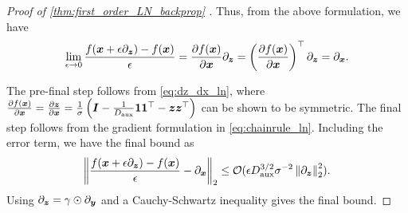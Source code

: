 \begin{proof}[ Proof of \cref{thm:first_order_LN_backprop} ]
Thus, from the above formulation, we have
\begin{align*}
    \lim_{\epsilon \to 0} \frac{ f( {\bm{x}} + \epsilon \partial_{ {\bm{z}} } ) - f({\bm{x}}) }{ \epsilon } = \frac{ \partial  f({\bm{x}}) }{ \partial {\bm{x}} }\partial_{ {\bm{z}} } = \left( \frac{ \partial  f({\bm{x}}) }{ \partial {\bm{x}} } \right)^{\top} \partial_{ {\bm{z}} } = \partial_{{\bm{x}}}.
\end{align*}

The pre-final step follows from \cref{eq:dz_dx_ln}, where $\frac{ \partial  f({\bm{x}}) }{ \partial {\bm{x}} } = \frac{\partial {\bm{z}}}{ \partial {\bm{x}}} = \frac{1}{\sigma} \left( {\bm{I}} - \frac{ 1 }{ D_{\text{aux}} } \mathbf{1} \mathbf{1}^{\top} - {\bm{z}} {\bm{z}}^{\top} \right)$ can be shown to be symmetric. The final step follows from the gradient formulation in \cref{eq:chainrule_ln}. Including the error term, we have the final bound as
\begin{align*}
    \left\| \frac{ f( {\bm{x}} + \epsilon \partial_{ {\bm{z}} } ) - f({\bm{x}}) }{ \epsilon } - \partial_{{\bm{x}}} \right\|_2 \le \mathcal{O} ( \epsilon D_{\text{aux}}^{3/2} \sigma^{-2} \left\| \partial_{{\bm{z}}} \right\|^2_2 ).
\end{align*}
Using $\partial_{{\bm{z}}} = \gamma \odot \partial_{{\bm{y}}}$ and a Cauchy-Schwartz inequality gives the final bound.
\end{proof}


